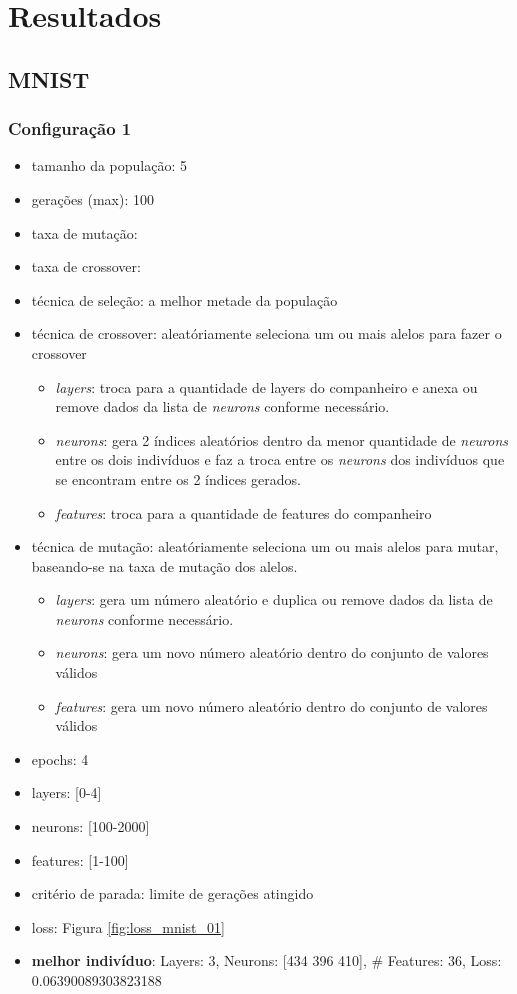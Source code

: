 \documentclass[twoside,conference,a4paper]{IEEEtran}
\begin{document}
\section{Resultados}

\subsection{MNIST}

\subsubsection{Configuração 1}

\begin{itemize}
    \item tamanho da população: 5
    \item gerações (max): 100
    \item taxa de mutação:
    \item taxa de crossover:
    \item técnica de seleção: a melhor metade da população
    \item técnica de crossover: aleatóriamente seleciona um ou mais alelos para fazer o crossover
    \begin{itemize}
        \item \emph{layers}: troca para a quantidade de layers do companheiro e anexa ou remove dados da lista de \emph{neurons} conforme necessário.
        \item \emph{neurons}: gera 2 índices aleatórios dentro da menor quantidade de \emph{neurons} entre os dois indivíduos e faz a troca entre os \emph{neurons} dos indivíduos que se encontram entre os 2 índices gerados.
        \item \emph{features}: troca para a quantidade de features do companheiro
    \end{itemize}
    \item técnica de mutação: aleatóriamente seleciona um ou mais alelos para mutar, baseando-se na taxa de mutação dos alelos.
    \begin{itemize}
        \item \emph{layers}: gera um número aleatório e duplica ou remove dados da lista de \emph{neurons} conforme necessário.
        \item \emph{neurons}: gera um novo número aleatório dentro do conjunto de valores válidos
        \item \emph{features}: gera um novo número aleatório dentro do conjunto de valores válidos
    \end{itemize}
    \item epochs: 4
    \item layers: [0-4]
    \item neurons: [100-2000]
    \item features: [1-100]
    \item critério de parada: limite de gerações atingido
    \item loss: Figura \ref{fig:loss_mnist_01}
    \item \textbf{melhor indivíduo}: Layers: 3, Neurons: [434 396 410], \# Features: 36, Loss: 0.06390089303823188
\end{itemize}
\end{document}
